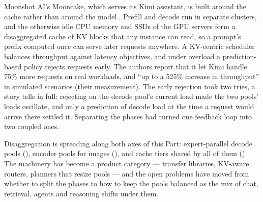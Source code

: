 


Moonshot AI's Mooncake, which serves its Kimi assistant, is built around the
cache rather than around the model \cite{qin2024mooncake}. Prefill and decode
run in separate clusters, and the otherwise idle CPU memory and SSDs of the GPU
servers form a disaggregated cache of KV blocks that any instance can read, so
a prompt's prefix computed once can serve later requests anywhere. A
KV-centric scheduler balances throughput against latency objectives, and under
overload a prediction-based policy rejects requests early. The authors report
that it let Kimi handle 75\% more requests on real workloads, and ``up to a
525\% increase in throughput'' in simulated scenarios (their measurement). The
early rejection took two tries, a story  tells in full:
rejecting on the decode pool's current load made the two pools' loads oscillate,
and only a prediction of decode load at the time a request would arrive there
settled it. Separating the phases had turned one feedback loop into two coupled
ones.


Disaggregation is spreading along both axes of this Part: expert-parallel
decode pools (), encoder pools for images
(), and cache tiers shared by all of them
(). The machinery has become a product category ---
transfer libraries, KV-aware routers, planners that resize pools --- and the
open problems have moved from whether to split the phases to how to keep the
pools balanced as the mix of chat, retrieval, agents and reasoning shifts under
them.

\ExercisesSection

